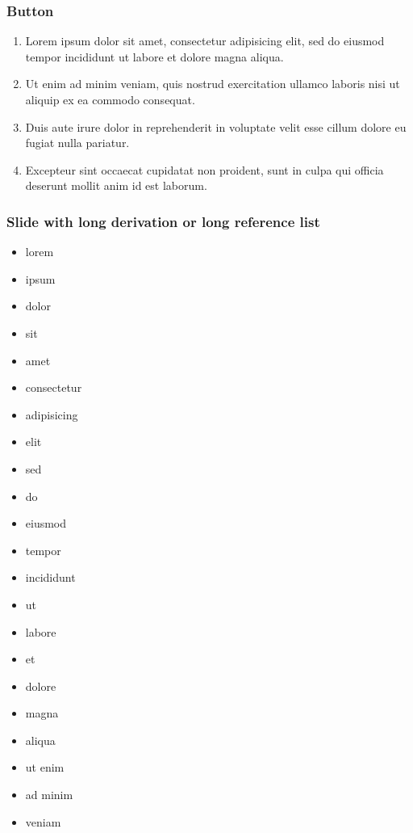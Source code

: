 \documentclass[11pt,xcolor={dvipsnames},hyperref={pdftex,pdfpagemode=UseNone,hidelinks,pdfdisplaydoctitle=true},usepdftitle=false]{beamer}
\begin{document}
\begin{frame}[label=firstSlide]
\frametitle{Button}
\begin{enumerate}
\item Lorem ipsum dolor sit amet, consectetur adipisicing elit, sed do eiusmod
tempor incididunt ut labore et dolore magna aliqua.
\item  Ut enim ad minim veniam, quis nostrud exercitation ullamco laboris nisi ut aliquip ex ea commodo consequat. 
\item Duis aute irure dolor in reprehenderit in voluptate velit esse
cillum dolore eu fugiat nulla pariatur. 
\item Excepteur sint occaecat cupidatat non proident, sunt in culpa qui officia deserunt mollit anim id est laborum.
\end{enumerate}
\hyperlink{backupSlide}{}
\hyperlink{anotherBackupSlide}{}
\end{frame}

\begin{frame}[allowframebreaks=0.8]
\frametitle{Slide with long derivation or long reference list}
\begin{itemize}
\item lorem 
\item ipsum 
\item dolor 
\item sit 
\item amet
\item consectetur 
\item adipisicing 
\item elit
\item sed
\item do
\item eiusmod
\item tempor
\item incididunt
\item ut
\item labore
\item et 
\item dolore 
\item magna 
\item aliqua
\item ut enim
\item ad minim 
\item veniam
\end{itemize}
\end{frame}

\fi
\lastslide
\end{document}

